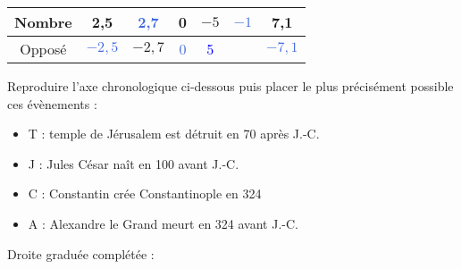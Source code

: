 \begin{Maquette}[Fiche,CorrigeFin,Colonnes=2]{}
\begin{multicols}{2}
      \begin{Solution}
         \medskip
         {
         \begin{tabular}{|*{7}{c|}}
            \hline
            Nombre & 2,5 & \textcolor{RoyalBlue}{2,7} & 0 & $-5$ & \textcolor{RoyalBlue}{$-1$} & 7,1 \\
            \hline
            Opposé & \!\textcolor{RoyalBlue}{$-2,5$} & \!$-2,7$ & \textcolor{RoyalBlue}{0} & \textcolor{blue}{5} & \; 1 & \!\!\textcolor{RoyalBlue}{$-7,1$} \\
            \hline 
         \end{tabular}}
      \end{Solution}
      

      \begin{exercice} %
         Reproduire l'axe chronologique ci-dessous puis placer le plus précisément possible ces évènements : \par \medskip
         \begin{itemize}
            \item T : temple de Jérusalem est détruit en 70 après J.-C.
            \item J : Jules César naît en 100 avant J.-C.
            \item C : Constantin crée Constantinople en 324
            \item A : Alexandre le Grand meurt en 324 avant J.-C.
         \end{itemize}
      \end{exercice}

      \begin{Solution}
         Droite graduée complétée : \par
      \end{Solution}
      

\end{multicols}
\end{Maquette}
